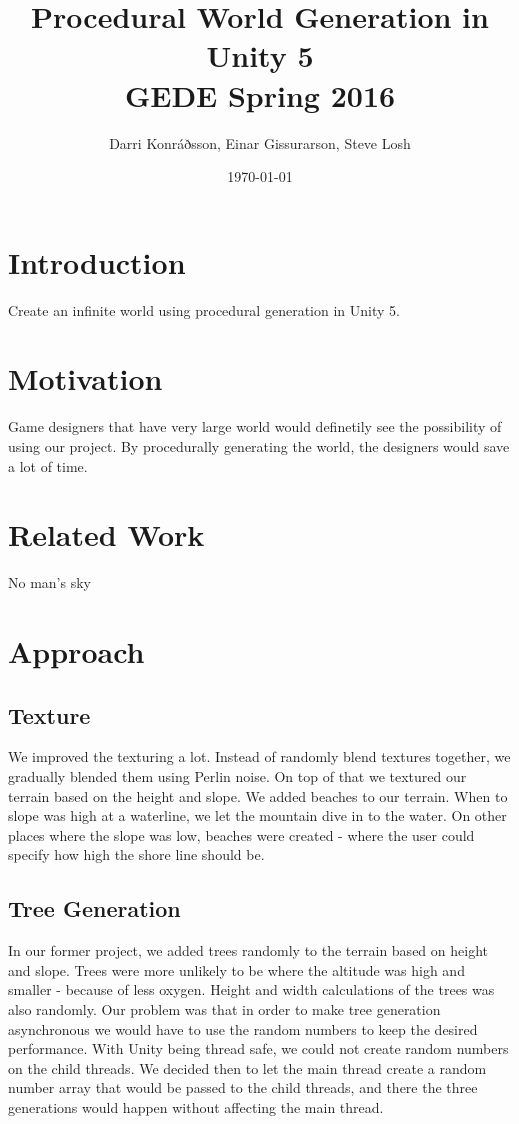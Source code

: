 \documentclass{article}
\title{%
    Procedural World Generation in Unity 5
\\ \large GEDE Spring 2016}
\author{Darri Konráðsson, Einar Gissurarson, Steve Losh}
\date{\today}
\begin{document}
\maketitle

\section{Introduction}
\label{sec:intro}
Create an infinite world using procedural generation in Unity 5.

\section{Motivation}
\label{sec:motiv}
Game designers that have very large world would definetily see the possibility of using our project. By procedurally generating the world, the designers would save a lot of time.

\section{Related Work}
\label{sec:related}
No man's sky

\section{Approach}
\label{sec:approach}

\subsection{Texture}
\label{subsec:texture}
We improved the texturing a lot. Instead of randomly blend textures together, we gradually blended them using Perlin noise. On top of that we textured our terrain based on the height and slope. 
We added beaches to our terrain. When to slope was high at a waterline, we let the mountain dive in to the water. On other places where the slope was low, beaches were created - where the user could specify how high the shore line should be.

\subsection{Tree Generation}
\label{subsec:tree}
In our former project, we added trees randomly to the terrain based on height and slope. Trees were more unlikely to be where the altitude was high and smaller - because of less oxygen. Height and width calculations of the trees was also randomly.
Our problem was that in order to make tree generation asynchronous we would have to use the random numbers to keep the desired performance. With Unity being thread safe, we could not create random numbers on the child threads. We decided then to let the main thread create a random number array that would be passed to the child threads, and there the three generations would happen without affecting the main thread.
\end{document}
